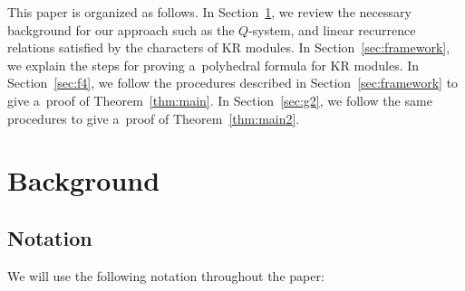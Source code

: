 \documentclass[pdftex]{sigma}
\numberwithin{equation}{section}
\theoremstyle{definition}
\begin{document}
This paper is organized as follows.
In Section~\ref{sec:background}, we review the necessary background for our approach such as the $Q$-system, and linear recurrence relations satisfied by the characters of KR modules.
In Section~\ref{sec:framework}, we explain the steps for proving a~polyhedral formula for KR modules.
In Section~\ref{sec:f4}, we follow the procedures described in Section~\ref{sec:framework} to give a~proof of Theorem~\ref{thm:main}.
In Section~\ref{sec:g2}, we follow the same procedures to give a~proof of Theorem~\ref{thm:main2}.


\section{Background}\label{sec:background}
\subsection*{Notation}
We will use the following notation throughout the paper:
\end{document}
